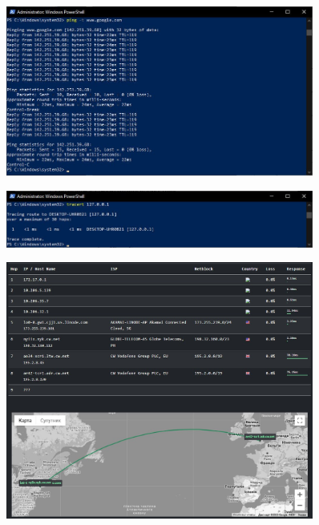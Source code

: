\documentclass[12pt]{extarticle}
\begin{document}
\begin{figure}[H]
    \centering
    \includegraphics[width=0.90\textwidth]{tracert-t.jpg}
    \caption{}
\end{figure}
\begin{figure}[H]
    \centering
    \includegraphics[width=0.90\textwidth]{tracert127.jpg}
    \caption{}
\end{figure}
\begin{figure}[H]
    \centering
    \includegraphics[width=0.90\textwidth]{tracerout.jpg}
    \caption{}
\end{figure}
\end{document}
